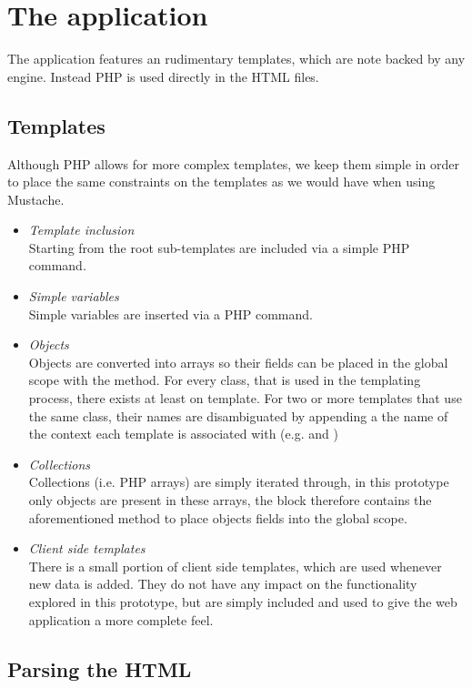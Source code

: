 \section{The application}
The application features an rudimentary templates, which are note backed by any
engine. Instead PHP is used directly in the HTML files.
\subsection{Templates}
Although PHP allows for more complex templates, we keep them simple in order to
place the same constraints on the templates as we would have when using
Mustache.
\begin{itemize}
	\item \emph{Template inclusion}\\
	Starting from the root sub-templates are included via a simple
	PHP  command.
	\item \emph{Simple variables}\\
	Simple variables are inserted via a PHP  command.
	\item \emph{Objects}\\
	Objects are converted into arrays so their fields can be placed in the global
	scope with the  method. For every class, that is used in the
	templating process, there exists at least on template. For two or more
	templates that use the same class, their names are disambiguated by appending
	a the name of the context each template is associated with (e.g.
	 and )
	\item \emph{Collections}\\
	Collections (i.e. PHP arrays) are simply iterated through, in this prototype
	only objects are present in these arrays, the  block therefore
	contains the aforementioned method to place objects fields into the global
	scope.
	\item \emph{Client side templates}\\
	There is a small portion of client side templates, which are used whenever new
	data is added.  They do not have any impact on the functionality explored in
	this prototype, but are simply included and used to give the web application a
	more complete feel.
\end{itemize}
\subsection{Parsing the HTML}
